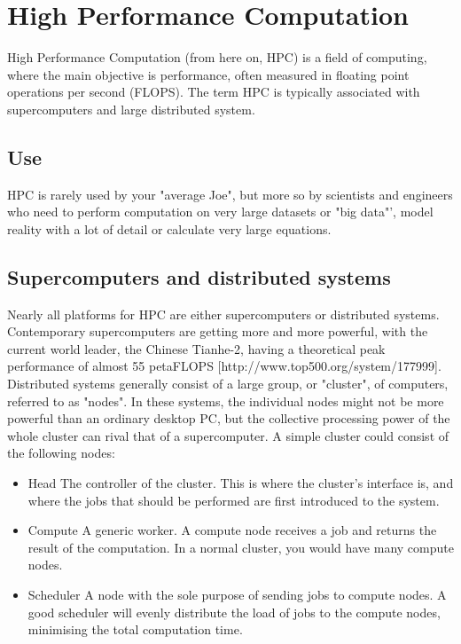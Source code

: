 \chapter{High Performance Computation}
High Performance Computation (from here on, HPC) is a field of computing, where the main objective is performance, often measured in floating point operations per second (FLOPS). The term HPC is typically associated with supercomputers and large distributed system.

\section{Use}
HPC is rarely used by your "average Joe", but more so by scientists and engineers who need to perform computation on very large datasets or "big data"', model reality with a lot of detail or calculate very large equations.

\section{Supercomputers and distributed systems}
Nearly all platforms for HPC are either supercomputers or distributed systems. Contemporary supercomputers are getting more and more powerful, with the current world leader, the Chinese Tianhe-2, having a theoretical peak performance of almost 55 petaFLOPS [http://www.top500.org/system/177999]. 
Distributed systems generally consist of a large group, or "cluster", of computers, referred to as "nodes". In these systems, the individual nodes might not be more powerful than an ordinary desktop PC, but the collective processing power of the whole cluster can rival that of a supercomputer. 
A simple cluster could consist of the following nodes:
\begin{itemize}
	\item Head
	The controller of the cluster. This is where the cluster's interface is, and where the jobs that should be performed are first introduced to the system.
	\item Compute
	A generic worker. A compute node receives a job and returns the result of the computation. In a normal cluster, you would have many compute nodes.
	\item Scheduler
	A node with the sole purpose of sending jobs to compute nodes. A good scheduler will evenly distribute the load of jobs to the compute nodes, minimising the total computation time.
\end{itemize}


